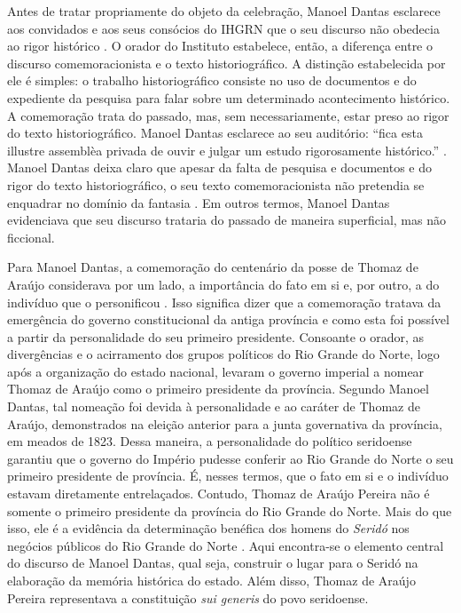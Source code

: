 \begin{refsection}
    Antes de tratar propriamente do objeto da celebração, Manoel Dantas esclarece aos convidados e aos seus consócios do IHGRN que o seu discurso não obedecia ao rigor histórico \cite[p.~177]{DiscursoManoealDantas}. O orador do Instituto estabelece, então, a diferença entre o discurso comemoracionista e o texto historiográfico. A distinção estabelecida por ele é simples: o trabalho historiográfico consiste no uso de documentos e do expediente da pesquisa para falar sobre um determinado acontecimento histórico. A comemoração trata do passado, mas, sem necessariamente, estar preso ao rigor do texto historiográfico. Manoel Dantas esclarece ao seu auditório: ``fica esta illustre assemblèa privada de ouvir e julgar um estudo rigorosamente histórico.'' \cite[p.~176]{DiscursoManoealDantas}. Manoel Dantas deixa claro que apesar da falta de pesquisa e documentos e do rigor do texto historiográfico, o seu texto comemoracionista não pretendia se enquadrar no domínio da fantasia \cite[p.~175]{DiscursoManoealDantas}. Em outros termos, Manoel Dantas evidenciava que seu discurso trataria do passado de maneira superficial, mas não ficcional. 

    Para Manoel Dantas, a comemoração do centenário da posse de Thomaz de Araújo considerava por um lado, a importância do fato em si e, por outro, a do indivíduo que o personificou \cite[p.~178]{DiscursoManoealDantas}. Isso significa dizer que a comemoração tratava da emergência do governo constitucional da antiga província e como esta foi possível a partir da personalidade do seu primeiro presidente. Consoante o orador, as divergências e o acirramento dos grupos políticos do Rio Grande do Norte, logo após a organização do estado nacional, levaram o governo imperial a nomear Thomaz de Araújo como o primeiro presidente da província.  Segundo Manoel Dantas, tal nomeação foi devida à personalidade e ao caráter de Thomaz de Araújo, demonstrados na eleição anterior para a junta governativa da província, em meados de 1823. Dessa maneira, a personalidade do político seridoense garantiu que o governo do Império pudesse conferir ao Rio Grande do Norte o seu primeiro presidente de província. É, nesses termos, que o fato em si e o indivíduo estavam diretamente entrelaçados. Contudo, Thomaz de Araújo Pereira não é somente o primeiro presidente da província do Rio Grande do Norte. Mais do que isso, ele é a evidência da determinação benéfica dos homens do \textit{Seridó} nos negócios públicos do Rio Grande do Norte \cite[p.~178]{DiscursoManoealDantas}. Aqui encontra-se o elemento central do discurso de Manoel Dantas, qual seja, construir o lugar para o Seridó na elaboração da memória histórica do estado. Além disso, Thomaz de Araújo Pereira representava a constituição \textit{sui generis} do povo seridoense.  


\end{refsection}
